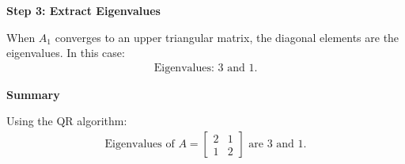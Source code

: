 \documentclass[journal]{IEEEtran}
\begin{document}
\begin{enumerate}
\textbf{Step 3: Extract Eigenvalues}

When $A_1$ converges to an upper triangular matrix, the diagonal elements are the eigenvalues. In this case:
\begin{align}
    \text{Eigenvalues: } 3 \text{ and } 1.
\end{align}

\textbf{Summary}

Using the QR algorithm:
\begin{align}
    \text{Eigenvalues of } A = \begin{bmatrix} 2 & 1 \\ 1 & 2 \end{bmatrix} \text{ are } 3 \text{ and } 1.
\end{align}
\end{enumerate}
\end{document}
